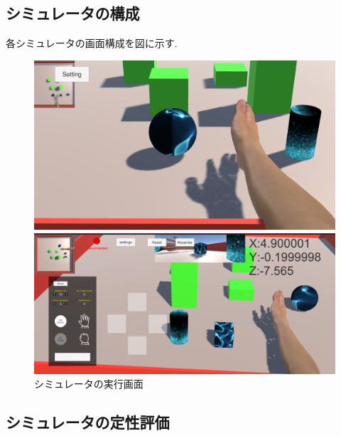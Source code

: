 \documentclass{ltjsarticle}
\begin{document}
	\subsection{シミュレータの構成}
		各シミュレータの画面構成を図に示す.
		\begin{figure}[H]
		\centering
		\begin{minipage}{0.9\columnwidth}
		\centering
		\includegraphics[width = \columnwidth]{../figs/PCnomal.png}
		\end{minipage}
		\hspace{0.04\columnwidth}
		\begin{minipage}{0.9\columnwidth}
		\centering
		\includegraphics[width = \columnwidth]{../figs/iOSnomal.png}
		\end{minipage}
		\caption{シミュレータの実行画面}
		\label{fig:simurate}
		\end{figure}
		\vspace{-25pt}

	\subsection{シミュレータの定性評価}
\end{document}
